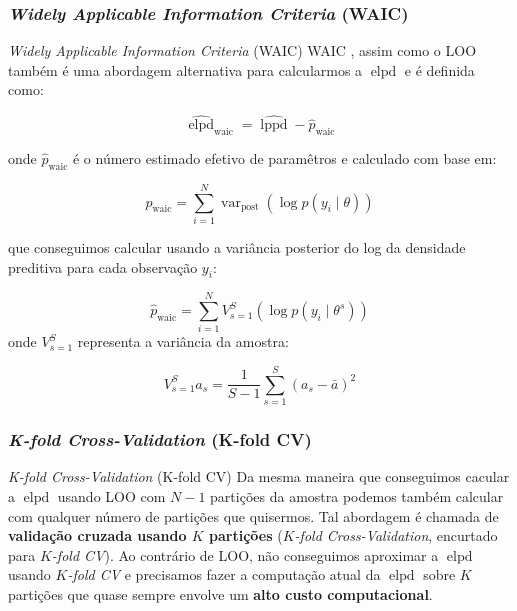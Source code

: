 \subsubsection{\textit{Widely Applicable Information Criteria} (WAIC)}
\begin{frame}{\textit{Widely Applicable Information Criteria} (WAIC)}
	\footnotesize
	WAIC \parencite{watanabe2010asymptotic}, assim como o LOO também é uma
	abordagem alternativa para calcularmos a $\operatorname{elpd}$ e é definida como:

	$$
		\widehat{\operatorname{elpd}}_{\text{waic}} = \widehat{\operatorname{lppd}} - \widehat{p}_{\text{waic}}
	$$

	onde $\widehat{p}_{\text{waic}}$ é o número estimado efetivo de paramêtros e
	calculado com base em:

	$$
		\widehat{p}_{\text{waic}} = \sum_{i=1}^N \operatorname{var}_{\text{post}} (\log p(y_i \mid \theta))
	$$

	que conseguimos calcular usando a variância posterior do log da densidade preditiva para cada observação $y_i$:

	$$
		\widehat{p}_{\text{waic}} = \sum_{i=1}^N V^S_{s=1} (\log p(y_i \mid \theta^s))
	$$
	onde $V^S_{s=1}$ representa a variância da amostra:

	$$
		V^S_{s=1} a_s = \frac{1}{S-1} \sum^S_{s=1} (a_s - \bar{a})^2
	$$
\end{frame}

\subsubsection{\textit{K-fold Cross-Validation} (K-fold CV)}
\begin{frame}{\textit{K-fold Cross-Validation} (K-fold CV)}
	Da mesma maneira que conseguimos cacular a $\operatorname{elpd}$ usando LOO
	com $N-1$ partições da amostra podemos também calcular com qualquer número de
	partições que quisermos.
	\vfill
	Tal abordagem é chamada de \textbf{validação cruzada usando $K$ partições}
	(\textit{$K$-fold Cross-Validation}, encurtado para \textit{$K$-fold CV}).
	\vfill
	Ao contrário de LOO, não conseguimos aproximar a
	$\operatorname{elpd}$ usando \textit{$K$-fold CV} e precisamos fazer a computação
	atual da $\operatorname{elpd}$ sobre $K$ partições que quase sempre envolve
	um \textbf{alto custo computacional}.
\end{frame}

